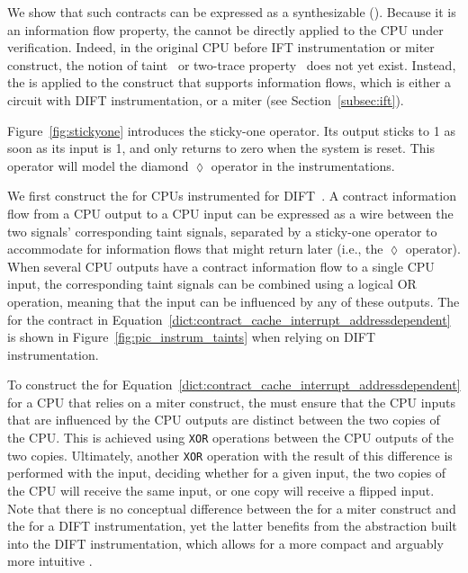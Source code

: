 
We show that such contracts can be expressed as a synthesizable \pici (\PICI).
Because it is an information flow property, the \PICI cannot be directly applied to the CPU under verification.
Indeed, in the original CPU before IFT instrumentation or miter construct, the notion of taint~\cite{solt2022cellift,ceesay2024mucfi} or two-trace property~\cite{wang2023specification,dinesh2024conjunct,dinesh2024conjunct,tan2025contractshadowlogic} does not yet exist.
Instead, the \PICI is applied to the construct that supports information flows, which is either a circuit with DIFT instrumentation, or a miter (see Section~\ref{subsec:ift}).

Figure~\ref{fig:stickyone} introduces the sticky-one operator.
Its output sticks to 1 as soon as its input is 1, and only returns to zero when the system is reset.
This operator will model the diamond $\lozenge$ operator in the instrumentations.

We first construct the \PICI for CPUs instrumented for DIFT~\cite{tiwari2009complete,solt2022cellift}.
A contract information flow from a CPU output to a CPU input can be expressed as a wire between the two signals' corresponding taint signals, separated by a sticky-one operator to accommodate for information flows that might return later (i.e., the $\lozenge$ operator).
When several CPU outputs have a contract information flow to a single CPU input, the corresponding taint signals can be combined using a logical OR operation, meaning that the input can be influenced by any of these outputs.
The \PICI for the contract in Equation~\ref{dict:contract_cache_interrupt_addressdependent} is shown in Figure~\ref{fig:pic_instrum_taints} when relying on DIFT instrumentation.

To construct the \PICI for Equation~\ref{dict:contract_cache_interrupt_addressdependent} for a CPU that relies on a miter construct, the \PICI must ensure that the CPU inputs that are influenced by the CPU outputs are distinct between the two copies of the CPU.
This is achieved using \texttt{XOR} operations between the CPU outputs of the two copies.
Ultimately, another \texttt{XOR} operation with the result of this difference is performed with the input, deciding whether for a given input, the two copies of the CPU will receive the same input, or one copy will receive a flipped input.
Note that there is no conceptual difference between the \PICI for a miter construct and the \PICI for a DIFT instrumentation, yet the latter benefits from the abstraction built into the DIFT instrumentation, which allows for a more compact and arguably more intuitive \PICI.

